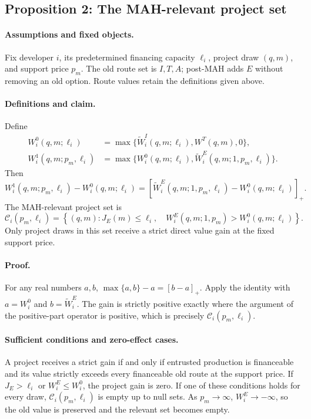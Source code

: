 \subsection{Proposition 2: The MAH-relevant project set}
\label{prop:p08-relevant-set}

\paragraph{Assumptions and fixed objects.}
Fix developer \(i\), its predetermined financing capacity \(\ell_i\), project
draw \((q,m)\), and support price \(p_m\).
The old route set is \(I,T,A\); post-MAH adds \(E\) without removing an old
option. Route values retain the definitions given above.

\paragraph{Definitions and claim.}
Define
\begin{align}
  W_i^0(q,m;\ell_i)
  &=
  \max\{\widetilde W_i^I(q,m;\ell_i),W^T(q,m),0\},
  \label{eq:p08-old-value}\\
  W_i^1(q,m;p_m,\ell_i)
  &=
  \max\{W_i^0(q,m;\ell_i),
  \widetilde W_i^E(q,m;1,p_m,\ell_i)\}.
  \label{eq:p08-old-new-values}
\end{align}
Then
\begin{equation}
  W_i^1(q,m;p_m,\ell_i)-W_i^0(q,m;\ell_i)
  =
  \left[\widetilde W_i^E(q,m;1,p_m,\ell_i)
  -W_i^0(q,m;\ell_i)\right]_+.
  \label{eq:p08-positive-part-gain}
\end{equation}
The MAH-relevant project set is
\begin{equation}
  \mathcal C_i(p_m,\ell_i)
  =
  \left\{(q,m):
  J_E(m)\leq\ell_i,\quad
  W_i^E(q,m;1,p_m)>W_i^0(q,m;\ell_i)\right\}.
  \label{eq:p08-relevant-set}
\end{equation}
Only project draws in this set receive a strict direct value gain at the fixed
support price.

\paragraph{Proof.}
For any real numbers \(a,b\),
\(\max\{a,b\}-a=[b-a]_+\). Apply the identity with
\(a=W_i^0\) and \(b=\widetilde W_i^E\). The gain is strictly positive exactly where the
argument of the positive-part operator is positive, which is precisely
\(\mathcal C_i(p_m,\ell_i)\).

\paragraph{Sufficient conditions and zero-effect cases.}
A project receives a strict gain if and only if entrusted production is
financeable and its value strictly exceeds every financeable old route at the
support price. If \(J_E>\ell_i\) or \(W_i^E\leq W_i^0\), the project gain is
zero. If one of these conditions holds for every draw,
\(\mathcal C_i(p_m,\ell_i)\) is empty up to null sets.
As \(p_m\rightarrow\infty\), \(W_i^E\rightarrow-\infty\), so the old value is
preserved and the relevant set becomes empty.


